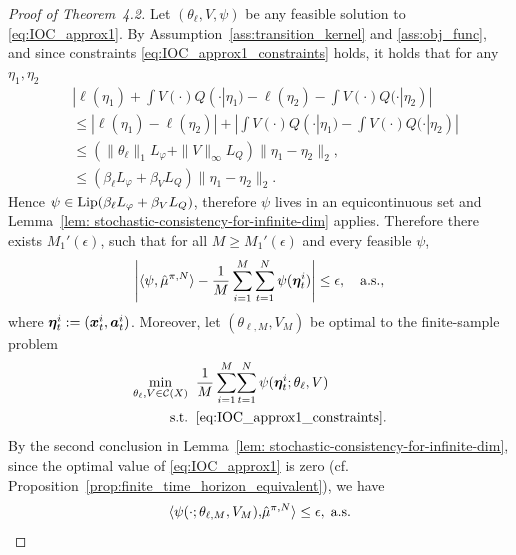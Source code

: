 \begin{proof}[Proof of Theorem~4.2]
Let $(\theta_\ell,V,\psi)$ be any feasible solution to \eqref{eq:IOC_approx1}. 
By Assumption~\ref{ass:transition_kernel} and \ref{ass:obj_func}, and since constraints \eqref{eq:IOC_approx1_constraints} holds, it holds that for any $\eta_1,\eta_2$
\begin{align*}
&|\ell(\eta_1)\!+\!\int V(\cdot) Q(\cdot|\eta_1)\!-\!\ell(\eta_2)\!-\!\int V(\cdot) Q(\cdot|\eta_2)|\\
&\le|\ell(\eta_1)-\ell(\eta_2)|+|\int V(\cdot) Q(\cdot|\eta_1)-\int V(\cdot) Q(\cdot|\eta_2)|\\
&\le \left(\|\theta_\ell\|_1 L_\varphi+\|V\|_\infty L_Q\right)\|\eta_1-\eta_2\|_2,\\
&\le \left(\beta_\ell L_\varphi+\beta_V L_Q\right)\|\eta_1-\eta_2\|_2.
\end{align*}
Hence $\psi\in\operatorname*{Lip}(\beta_\ell L_\varphi+\beta_V L_Q)$, therefore $\psi$ lives in an equicontinuous set and Lemma~\ref{lem: stochastic-consistency-for-infinite-dim} applies. 
Therefore there exists $M_1'(\epsilon)$, such that for all $M\geq M_1'(\epsilon)$ and every feasible $\psi$,
\begin{align}
    \left|\langle \psi, \hat{\mu}^{\relax{\pi},N} \rangle- \frac{1}{M}\sum_{i=1}^M\sum_{t=1}^N \psi(\bm\eta_t^i) \right| \leq \epsilon,\quad\text{a.s.},
    \label{eq:psi_ulln}
\end{align}
where $\bm\eta_t^i:=(\bm{x}_t^i,\bm{a}_t^i)$.
Moreover, let $(\theta_{\ell,M}, V_M)$ be optimal to the finite-sample problem
\begin{equation}
\begin{aligned}
\min_{\theta_{\ell},V\in\mathcal{C}(X)} &\;\;\frac{1}{M}\sum_{i=1}^M\!\sum_{t=1}^N\psi(\bm\eta_t^i;\theta_\ell,V)\\
\operatorname*{s.\hspace{-2pt}t.} &\;\; \eqref{eq:IOC_approx1_constraints}.
\end{aligned}
\label{eq:data_psi_ioc_approx}
\end{equation}
By the second conclusion in Lemma~\ref{lem: stochastic-consistency-for-infinite-dim}, 
since the optimal value of \eqref{eq:IOC_approx1} is zero (cf. Proposition~\ref{prop:finite_time_horizon_equivalent}), we have
\begin{align}
    \langle \psi(\cdot;\theta_{\ell,M}, V_M),\!\hat\mu^{\relax{\pi},N} \rangle\leq \epsilon, \; \text{a.s.}\label{eq: M approx}
\end{align}


\end{proof}
